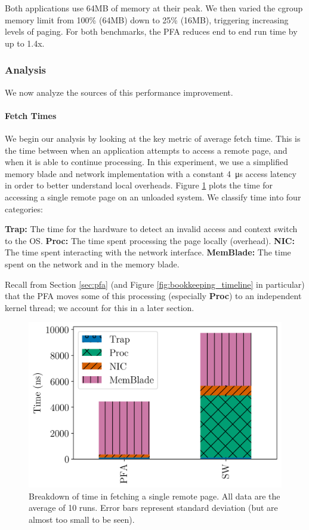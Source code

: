   Both applications use 64MB of memory at their peak. We then
  varied the cgroup memory limit from 100\% (64MB) down to 25\% (16MB),
  triggering increasing levels of paging. For both benchmarks, the PFA reduces
  end to end run time by up to 1.4x.

\subsubsection{Analysis}
  We now analyze the sources of this performance improvement.
  
  \paragraph{Fetch Times}
  We begin our analysis by looking at the key metric of average fetch time.
  This is the time between when an application attempts to access a remote
  page, and when it is able to continue processing. In this experiment, we use
  a simplified memory blade and network implementation with a constant
  \SI{4}{\micro\second} access latency in order to better understand local
  overheads. Figure \ref{fig:fetch_breakdown} plots the time for accessing a
  single remote page on an unloaded system. We classify time into four
  categories:

  \begin{outline}
    \1 \textbf{Trap:} The time for the hardware to detect an invalid access and
    context switch to the OS.
    \1 \textbf{Proc:} The time spent processing the page locally (overhead).
    \1 \textbf{NIC:} The time spent interacting with the network interface.
    \1 \textbf{MemBlade:} The time spent on the network and in the memory
    blade.
  \end{outline}

  Recall from Section \ref{sec:pfa} (and Figure \ref{fig:bookkeeping_timeline}
  in particular) that the PFA moves some of this processing (especially
  \textbf{Proc}) to an independent kernel thread; we account for this in a
  later section. 

  \begin{figure}[h] \centering
    \includegraphics[width=0.6\columnwidth]{figs/fetch_breakdown.png}
    \vspace{-5mm}
    \caption{Breakdown of time in fetching a single remote page. All data are 
    the average of 10 runs. Error bars represent standard deviation (but are
  almost too small to be seen).}
    \label{fig:fetch_breakdown}
  \end{figure}

